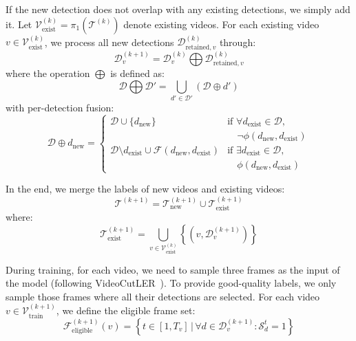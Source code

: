 If the new detection does not overlap with any existing detections, we simply add it. Let $\mathcal{V}_{\text{exist}}^{(k)} = \pi_1(\mathcal{T}^{(k)})$ denote existing videos. For each existing video $v \in \mathcal{V}_{\text{exist}}^{(k)}$, we process all new detections $\mathcal{D}_{\text{retained},v}^{(k)}$ through:
\begin{equation}
    \mathcal{D}_v^{(k+1)} = \mathcal{D}_v^{(k)} \bigoplus \mathcal{D}_{\text{retained},v}^{(k)}
\end{equation}
where the operation $\bigoplus$ is defined as:
\begin{equation}
    \mathcal{D} \bigoplus \mathcal{D}' = \bigcup_{d' \in \mathcal{D}'} \left( \mathcal{D} \oplus d' \right)
\end{equation}
with per-detection fusion:
\begin{equation}
\mathcal{D} \oplus d_{\text{new}} = 
\begin{cases}
\mathcal{D} \cup \{d_{\text{new}}\} & \text{if } \forall d_{\text{exist}} \in \mathcal{D}, \\
& \quad \neg\phi(d_{\text{new}}, d_{\text{exist}}) \\
\mathcal{D} \setminus d_{\text{exist}} \cup \mathcal{F}(d_{\text{new}}, d_{\text{exist}}) & \text{if } \exists d_{\text{exist}} \in \mathcal{D}, \\
& \quad \phi(d_{\text{new}}, d_{\text{exist}})
\end{cases}
\end{equation}

In the end, we merge the labels of new videos and existing videos:
\begin{equation}
    \mathcal{T}^{(k+1)} = \mathcal{T}_{\text{new}}^{(k+1)} \cup \mathcal{T}_{\text{exist}}^{(k+1)}
\end{equation}
where:
\begin{equation}
    \mathcal{T}_{\text{exist}}^{(k+1)} =  \bigcup_{v \in \mathcal{V}_{\text{exist}}^{(k)}} \left\{ \left(v, \mathcal{D}_{v}^{(k+1)} \right) \right\}
\end{equation}

During training, for each video, we need to sample three frames as the input of the model (following VideoCutLER~\cite{videocutler}). To provide good-quality labels, we only sample those frames where all their detections are selected. For each video $v \in \mathcal{V}_{\text{train}}^{(k+1)}$, we define the eligible frame set:
\begin{equation}
\mathcal{F}_{\text{eligible}}^{(k+1)}(v) = \left\{ t \in [1,T_v] \,\big|\, \forall d \in \mathcal{D}_v^{(k+1)}: \mathcal{S}_d^t = 1 \right\}
\end{equation}


